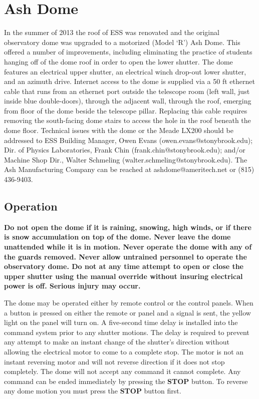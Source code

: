 \documentclass[12pt,titlepage]{article}
\begin{document}
\section{Ash Dome}
In the summer of 2013 the roof of ESS was renovated and the original observatory dome was upgraded to a motorized (Model `R') Ash Dome.
This offered a number of improvements, including eliminating the practice of students hanging off of the dome roof in order to open the lower shutter.
The dome features an electrical upper shutter, an electrical winch drop-out lower shutter, and an azimuth drive.
Internet access to the dome is supplied via a 50 ft ethernet cable that runs from an ethernet port outside the telescope room (left wall, just inside blue double-doors), through the adjacent wall, through the roof, emerging from floor of the dome beside the telescope pillar.
Replacing this cable requires removing the south-facing dome stairs to access the hole in the roof beneath the dome floor.
Technical issues with the dome or the Meade LX200 should be addressed to ESS Building Manager, Owen Evans (owen.evans@stonybrook.edu); Dir. of Physics Laboratories, Frank Chin (frank.chin@stonybrook.edu); and/or Machine Shop Dir., Walter Schmeling (walter.schmeling@stonybrook.edu). The Ash Manufacturing Company can be reached at ashdome@ameritech.net or (815) 436-9403.

\subsection{Operation}
\textbf{Do not open the dome if it is raining, snowing, high winds, or if there is snow accumulation on top of the dome.
Never leave the dome unattended while it is in motion.
Never operate the dome with any of the guards removed.
Never allow untrained personnel to operate the observatory dome.
Do not at any time attempt to open or close the upper shutter using the manual override without insuring electrical power is off.
Serious injury may occur.}
\par The dome may be operated either by remote control or the control panels.
When a button is pressed on either the remote or panel and a signal is sent, the yellow light on the panel will turn on.
A five-second time delay is installed into the command system prior to any shutter motions.
The delay is required to prevent any attempt to make an instant change of the shutter's direction without allowing the electrical motor to come to a complete stop.
The motor is not an instant reversing motor and will not reverse direction if it does not stop completely.
The dome will not accept any command it cannot complete.
Any command can be ended immediately by pressing the \textbf{STOP} button.
To reverse any dome motion you must press the \textbf{STOP} button first. 
\end{document}
